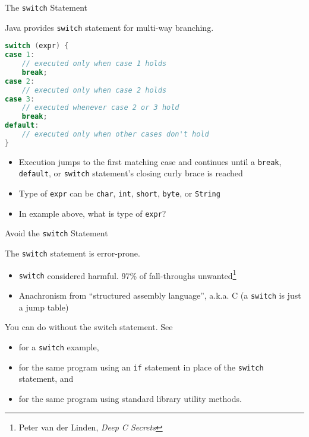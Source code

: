 \documentclass{beamer}
\begin{document}
\begin{frame}[fragile]{The {\tt switch} Statement}

Java provides {\tt switch} statement for multi-way branching.

\begin{lstlisting}[language=Java]
switch (expr) {
case 1:
    // executed only when case 1 holds
    break;
case 2:
    // executed only when case 2 holds
case 3:
    // executed whenever case 2 or 3 hold
    break;
default:
    // executed only when other cases don't hold
}
\end{lstlisting}

\begin{itemize}
\item Execution jumps to the first matching case and continues until a {\tt break}, {\tt default}, or {\tt switch} statement's closing curly brace is reached
\item Type of {\tt expr} can be {\tt char}, {\tt int}, {\tt short}, {\tt byte}, or {\tt String}
\item In example above, what is type of {\tt expr}?
\end{itemize}

\end{frame}

\begin{frame}[fragile]{Avoid the {\tt switch} Statement}

The {\tt switch} statement is error-prone.
\begin{itemize}
\item {\tt switch} considered harmful.  97\% of fall-throughs
  unwanted\footnote{Peter van der Linden, {\it Deep C Secrets}}
\item Anachronism from ``structured assembly language'', a.k.a. C (a {\tt switch} is just a jump table)
\end{itemize}

You can do without the switch statement.  See

\begin{itemize}
\item {} for a {\tt switch} example,
\item {} for the same program using an {\tt if} statement in place of the {\tt switch} statement, and
\item  {} for the same program using standard library utility methods.
\end{itemize}

\end{frame}
\end{document}
